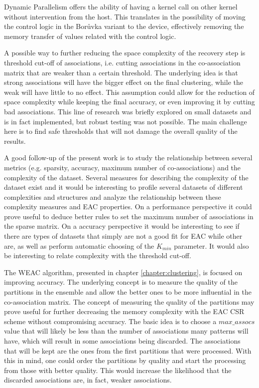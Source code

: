 Dynamic Parallelism offers the ability of having a kernel call on other kernel without intervention from the host.
This translates in the possibility of moving the control logic in the Borůvka variant to the device, effectively removing the memory transfer of values related with the control logic.

A possible way to further reducing the space complexity of the recovery step is threshold cut-off of associations, i.e. cutting associations in the co-association matrix that are weaker than a certain threshold.
The underlying idea is that strong associations will have the bigger effect on the final clustering, while the weak will have little to no effect.
This assumption could allow for the reduction of space complexity while keeping the final accuracy, or even improving it by cutting bad associations.
This line of research was briefly explored on small datasets and is in fact implemented, but robust testing was not possible.
The main challenge here is to find safe thresholds that will not damage the overall quality of the results.

A good follow-up of the present work is to study the relationship between several metrics (e.g. sparsity, accuracy, maximum number of co-associations) and the complexity of the dataset.
Several measures for describing the complexity of the dataset exist \cite{Ho2002} and it would be interesting to profile several datasets of different complexities and structures and analyze the relationship between these complexity measures and EAC properties.
On a performance perspective it could prove useful to deduce better rules to set the maximum number of associations in the sparse matrix.
On a accuracy perspective it would be interesting to see if there are types of datasets that simply are not a good fit for EAC while other are, as well as perform automatic choosing of the $K_{min}$ parameter.
It would also be interesting to relate complexity with the threshold cut-off.

The WEAC algorithm, presented in chapter \ref{chapter:clustering}, is focused on improving accuracy.
The underlying concept is to measure the quality of the partitions in the ensemble and allow the better ones to be more influential in the co-association matrix.
The concept of measuring the quality of the partitions may prove useful for further decreasing the memory complexity with the EAC CSR scheme without compromising accuracy.
The basic idea is to choose a $max\_assocs$ value that will likely be less than the number of associations many patterns will have, which will result in some associations being discarded.
The associations that will be kept are the ones from the first partitions that were processed.
With this in mind, one could order the partitions by quality and start the processing from those with better quality.
This would increase the likelihood that the discarded associations are, in fact, weaker associations.


